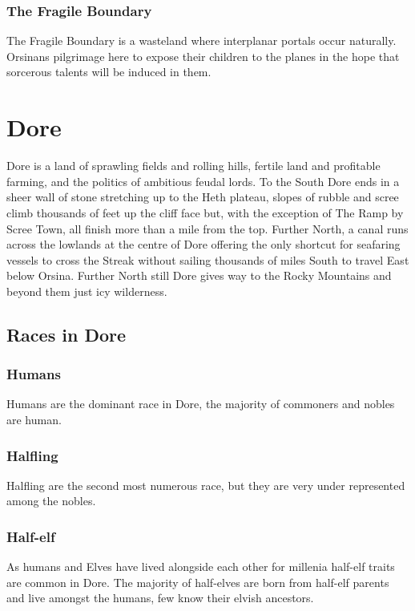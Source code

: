 \documentclass[10pt,twoside,twocolumn,openany,justified,bg=full,nomultitoc]{dndbook}
\begin{document}
\subsection{The Fragile Boundary}
\label{sec-3-4-3}
The Fragile Boundary is a wasteland where interplanar portals occur naturally. Orsinans pilgrimage here to expose their children to the planes in the hope that sorcerous talents will be induced in them.  

\chapter{Dore}
\label{sec-4}
Dore is a land of sprawling fields and rolling hills, fertile land and profitable farming, and the politics of ambitious feudal lords. To the South Dore ends in a sheer wall of stone stretching up to the Heth plateau, slopes of rubble and scree climb thousands of feet up the cliff face but, with the exception of The Ramp by Scree Town, all finish more than a mile from the top. Further North, a canal runs across the lowlands at the centre of Dore offering the only shortcut for seafaring vessels to cross the Streak without sailing thousands of miles South to travel East below Orsina. Further North still Dore gives way to the Rocky Mountains and beyond them just icy wilderness.

\section{Races in Dore}
\label{sec-4-1}
\subsection{Humans}
\label{sec-4-1-1}
Humans are the dominant race in Dore, the majority of commoners and nobles are human.
\subsection{Halfling}
\label{sec-4-1-2}
Halfling are the second most numerous race, but they are very under represented among the nobles.
\subsection{Half-elf}
\label{sec-4-1-3}
As humans and Elves have lived alongside each other for millenia half-elf traits are common in Dore. The majority of half-elves are born from half-elf parents and live amongst the humans, few know their elvish ancestors.
\end{document}
